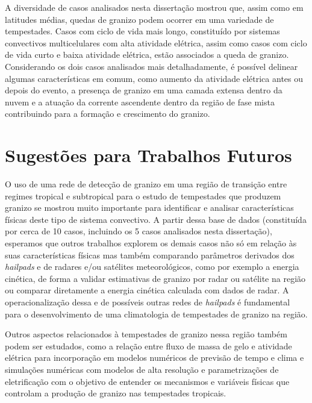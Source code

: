 A diversidade de casos analisados nesta dissertação mostrou que, assim como em latitudes médias, quedas de granizo podem ocorrer em uma variedade de tempestades. Casos com ciclo de vida mais longo, constituído por sistemas convectivos multicelulares com alta atividade elétrica, assim como casos com ciclo de vida curto e baixa atividade elétrica, estão associados a queda de granizo. Considerando os dois casos analisados mais detalhadamente, é possível delinear algumas características em comum, como aumento da atividade elétrica antes ou depois do evento, a presença de granizo em uma camada extensa dentro da nuvem e a atuação da corrente ascendente dentro da região de fase mista contribuindo para a formação e crescimento do granizo.

\section{Sugestões para Trabalhos Futuros}\label{sugestoes}

O uso de uma rede de detecção de granizo em uma região de transição entre regimes tropical e subtropical para o estudo de tempestades que produzem granizo se mostrou muito importante para identificar e analisar características físicas deste tipo de sistema convectivo. A partir dessa base de dados (constituída por cerca de 10 casos, incluindo os 5 casos analisados nesta dissertação), esperamos que outros trabalhos explorem os demais casos não só em relação às suas características físicas mas também comparando 
parâmetros derivados dos \textit{hailpads} e de radares e/ou satélites meteorológicos, como por exemplo a energia cinética, de forma a validar estimativas de granizo por radar ou satélite na região ou comparar diretamente a energia cinética calculada com dados de radar. A operacionalização dessa e de possíveis outras redes de \textit{hailpads} é fundamental para o desenvolvimento de uma climatologia de tempestades de granizo na região.

Outros aspectos relacionados à tempestades de granizo nessa região também podem ser estudados, como a relação entre fluxo de massa de gelo e atividade elétrica para incorporação em modelos numéricos de previsão de tempo e clima e simulações numéricas com modelos de alta resolução e parametrizações de eletrificação com o objetivo de entender os mecanismos e variáveis físicas que controlam a produção de granizo nas tempestades tropicais.


